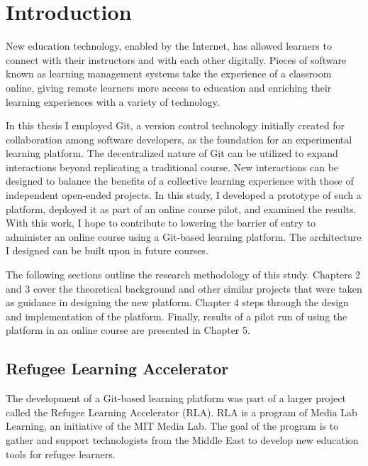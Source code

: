 \documentclass[12pt,twoside]{mitthesis}
\begin{document}
\newpage
\listoffigures


\chapter{Introduction}

New education technology, enabled by the Internet, has allowed learners to connect with their instructors and with each other digitally. Pieces of software known as learning management systems take the experience of a classroom online, giving remote learners more access to education and enriching their learning experiences with a variety of technology.

In this thesis I employed Git, a version control technology initially created for collaboration among software developers, as the foundation for an experimental learning platform. The decentralized nature of Git can be utilized to expand interactions beyond replicating a traditional course. New interactions can be designed to balance the benefits of a collective learning experience with those of independent open-ended projects. In this study, I developed a prototype of such a platform, deployed it as part of an online course pilot, and examined the results. With this work, I hope to contribute to lowering the barrier of entry to administer an online course using a Git-based learning platform. The architecture I designed can be built upon in future courses. 

The following sections outline the research methodology of this study. Chapters 2 and 3 cover the theoretical background and other similar projects that were taken as guidance in designing the new platform. Chapter 4 steps through the design and implementation of the platform. Finally, results of a pilot run of using the platform in an online course are presented in Chapter 5. 

\section{Refugee Learning Accelerator}

The development of a Git-based learning platform was part of a larger project called the Refugee Learning Accelerator (RLA). RLA is a program of Media Lab Learning, an initiative of the MIT Media Lab. The goal of the program is to gather and support technologists from the Middle East to develop new education tools for refugee learners. 
\end{document}
